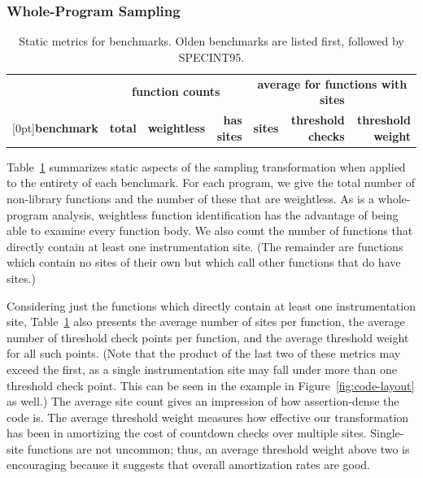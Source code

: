 \subsubsection{Whole-Program Sampling}
\label{sec:share:whole}

\begin{table}[tb]
  \centering
  \small
  \begin{tabular}{|l|rrr|rrr|}
    \hline
    & \multicolumn{3}{c|}{\textbf{function counts}} & \multicolumn{3}{c|}{\textbf{average for functions with sites}} \\
    \raisebox{1.5ex}[0pt]{\textbf{benchmark}} & \textbf{total} & \textbf{weightless} & \textbf{has sites} & \textbf{sites} & \textbf{threshold checks} & \textbf{threshold weight} \\
    \hline\hline
    
  \end{tabular}
  \caption{Static metrics for \CCured benchmarks.  Olden benchmarks
    are listed first, followed by SPECINT95.}
  \label{tab:share:static}
\end{table}

Table~\ref{tab:share:static} summarizes static aspects of the sampling
transformation when applied to the entirety of each benchmark.  For
each program, we give the total number of non-library functions and
the number of these that are weightless.  As \CCured is a
whole-program analysis, weightless function identification has the
advantage of being able to examine every function body.  We also count
the number of functions that directly contain at least one
instrumentation site.  (The remainder are functions which contain no
sites of their own but which call other functions that do have sites.)

Considering just the functions which directly contain at least one
instrumentation site, Table~\ref{tab:share:static} also presents the
average number of sites per function, the average number of threshold
check points per function, and the average threshold weight for all
such points.  (Note that the product of the last two of these metrics
may exceed the first, as a single instrumentation site may fall under
more than one threshold check point.  This can be seen in the example
in Figure~\ref{fig:code-layout} as well.)  The average site count
gives an impression of how assertion-dense the code is.  The average
threshold weight measures how effective our transformation has been in
amortizing the cost of countdown checks over multiple sites.
Single-site functions are not uncommon; thus, an average threshold
weight above two is encouraging because it suggests that overall
amortization rates are good.

